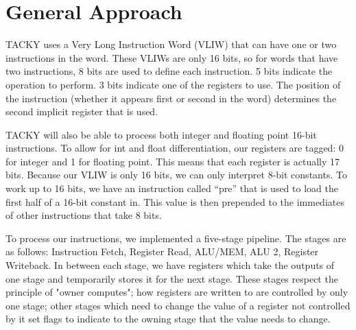 \documentclass[sigconf]{acmart}
\begin{document}
%

%
\maketitle

\section{General Approach}

TACKY uses a Very Long Instruction Word (VLIW) that can have one or two instructions in the word. These VLIWs are only 16 bits, so for words that have two instructions, 8 bits are used to define each instruction. 5 bits indicate the operation to perform. 3 bits indicate one of the registers to use. The position of the instruction (whether it appears first or second in the word) determines the second implicit register that is used.


TACKY will also be able to process both integer and floating point 16-bit instructions. To allow for int and float differentiation, our registers are tagged: 0 for integer and 1 for floating point. This means that each register is actually 17 bits. Because our VLIW is only 16 bits, we can only interpret 8-bit constants. To work up to 16 bits, we have an instruction called “pre” that is used to load the first half of a 16-bit constant in. This value is then prepended to the immediates of other instructions that take 8 bits.

To process our instructions, we implemented a five-stage pipeline. The stages are as follows: Instruction Fetch, Register Read, ALU/MEM, ALU 2, Register Writeback. In between each stage, we have registers which take the outputs of one stage and temporarily stores it for the next stage. These stages respect the principle of "owner computes"; how registers are written to are controlled by only one stage; other stages which need to change the value of a register not controlled by it set flags to indicate to the owning stage that the value needs to change. 
\end{document}
